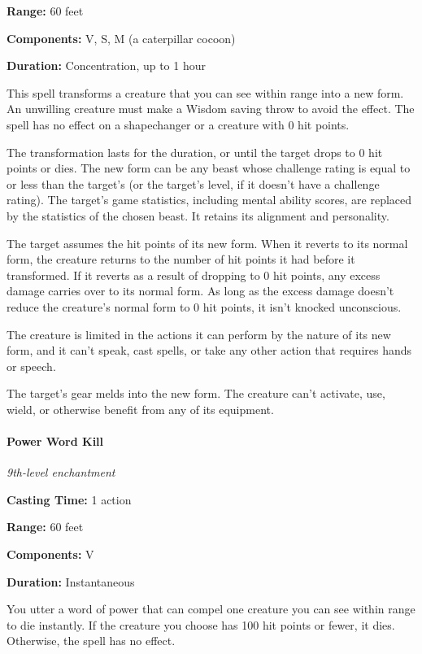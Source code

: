 \documentclass[
]{article}
\begin{document}
\textbf{Range:} 60 feet

\textbf{Components:} V, S, M (a caterpillar cocoon)

\textbf{Duration:} Concentration, up to 1 hour

This spell transforms a creature that you can see within range into a
new form. An unwilling creature must make a Wisdom saving throw to avoid
the effect. The spell has no effect on a shapechanger or a creature with
0 hit points.

The transformation lasts for the duration, or until the target drops to
0 hit points or dies. The new form can be any beast whose challenge
rating is equal to or less than the target's (or the target's level, if
it doesn't have a challenge rating). The target's game statistics,
including mental ability scores, are replaced by the statistics of the
chosen beast. It retains its alignment and personality.

The target assumes the hit points of its new form. When it reverts to
its normal form, the creature returns to the number of hit points it had
before it transformed. If it reverts as a result of dropping to 0 hit
points, any excess damage carries over to its normal form. As long as
the excess damage doesn't reduce the creature's normal form to 0 hit
points, it isn't knocked unconscious.

The creature is limited in the actions it can perform by the nature of
its new form, and it can't speak, cast spells, or take any other action
that requires hands or speech.

The target's gear melds into the new form. The creature can't activate,
use, wield, or otherwise benefit from any of its equipment.

\hypertarget{power-word-kill}{%
\paragraph{Power Word Kill}\label{power-word-kill}}

\emph{9th-level enchantment}

\textbf{Casting Time:} 1 action

\textbf{Range:} 60 feet

\textbf{Components:} V

\textbf{Duration:} Instantaneous

You utter a word of power that can compel one creature you can see
within range to die instantly. If the creature you choose has 100 hit
points or fewer, it dies. Otherwise, the spell has no effect.
\end{document}
